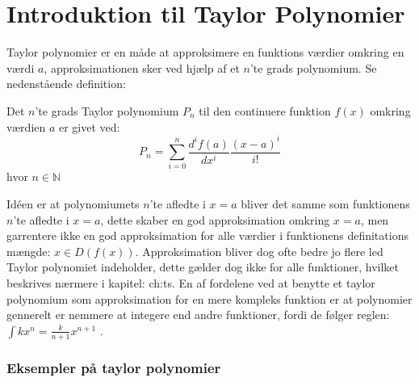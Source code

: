 \chapter{Introduktion til Taylor Polynomier}
\label{ch:tp}
Taylor polynomier er en måde at approksimere en funktions værdier omkring en værdi $a$, 
approksimationen sker ved hjælp af et $n$'te grads polynomium. Se nedenstående definition: 
\begin{defn}
    Det $n$'te grads Taylor polynomium $P_n$ til den continuere funktion $f(x)$ omkring værdien $a$ er givet ved:
    \[
    P_n = \sum^{n}_{i=0} \frac{d^i f(a)}{dx^i} \frac{(x-a)^{i}}{i!}
    \]
    hvor $n \in \mathbb{N}$
\end{defn}
\label{def:taylorPolynomium}
Idéen er at polynomiumets $n$'te afledte i $x = a$ bliver det samme som funktionens $n$'te afledte i $x = a$, 
dette skaber en god approksimation omkring $x = a$, men garrentere ikke en god approksimation 
for alle værdier i funktionens definitations mængde: $x \in D(f(x))$. Approksimation bliver dog ofte bedre jo 
flere led Taylor polynomiet indeholder, dette gælder dog ikke for alle funktioner, hvilket beskrives nærmere i kapitel: \refname{ch:ts}. 
En af fordelene ved at benytte et taylor polynomium som approksimation for en mere kompleks funktion
er at polynomier gennerelt er nemmere at integere end andre funktioner, fordi de følger reglen: $\int k x^n = \frac{k}{n + 1}x^{n + 1}$ .

\subsection*{Eksempler på taylor polynomier}
